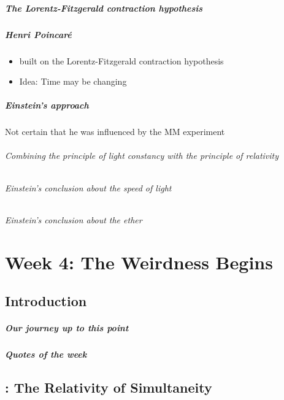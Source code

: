 \documentclass[pagesize,headsepline,10pt,parskip=half]{scrreprt}
\begin{document}
      \paragraph{The Lorentz-Fitzgerald contraction hypothesis}

      \paragraph{Henri Poincaré}
      \begin{itemize}
        \item built on the Lorentz-Fitzgerald contraction hypothesis
        \item Idea: Time may be changing
      \end{itemize}

      \paragraph{Einstein’s approach}
        Not certain that he was influenced by the MM experiment
        \subparagraph{Combining the principle of light constancy with the principle of relativity}

        \subparagraph{Einstein’s conclusion about the speed of light}
        \subparagraph{Einstein’s conclusion about the ether}

  \chapter{Week 4: The Weirdness Begins}
    \section{Introduction}
      \paragraph{Our journey up to this point}
      \paragraph{Quotes of the week}
      \paragraph{}

    \section{: The Relativity of Simultaneity}
\end{document}
